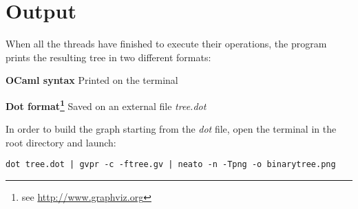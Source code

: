 \documentclass[a4paper]{article}
\begin{document}
\section{Output}
\label{sec:output}
When all the threads have finished to execute their operations, the program prints the resulting tree in two different formats:
\begin{compactitem}
  \item \textbf{OCaml syntax} Printed on the terminal
  \item \textbf{Dot format\footnote{see \url{http://www.graphviz.org}}} Saved on an external file \emph{tree.dot}
\end{compactitem}

\noindent
In order to build the graph starting from the \emph{dot} file, open the terminal in the root directory and launch:

\verb!dot tree.dot | gvpr -c -ftree.gv | neato -n -Tpng -o binarytree.png!
\\
\end{document}
